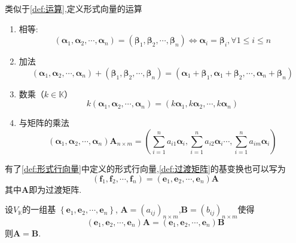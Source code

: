 \begin{formal}
\begin{definition}[形式向量的运算定义]\label{prop:形式向量的运算定义}
    类似于\cref{def:运算},定义形式向量的运算
    \begin{enumerate}[label=\textup{(\arabic*)}]
        \item 相等:
    \[
    \left(\bm{\alpha}_1,\bm{\alpha}_2,\cdots
    ,\bm{\alpha}_n\right)
    =\left(\bm{\beta}_1,\bm{\beta}_2,\cdots
    ,\bm{\beta}_n\right)
    \Longleftrightarrow 
    \bm{\alpha}_i = 
    \bm{\beta}_i,\forall
    1\leqslant i\leqslant n
    \]
    \item 加法\[
    \left(\bm{\alpha}_1,\bm{\alpha}_2,\cdots
    ,\bm{\alpha}_n\right)
    +\left(\bm{\beta}_1,\bm{\beta}_2,\cdots
    ,\bm{\beta}_n\right)
    =\left(
        \bm{\alpha}_1+\bm{\beta}_1
        ,\bm{\alpha}_1+\bm{\beta}_2,
        \cdots,\bm{\alpha}_n+
        \bm{\beta}_n
    \right)
    \]
    \item 数乘（$k\in\mathbb{K}$）\[
        k\left(\bm{\alpha}_1,\bm{\alpha}_2,\cdots
    ,\bm{\alpha}_n\right)=
    \left(k\bm{\alpha}_1,k\bm{\alpha}_2,\cdots
    ,k\bm{\alpha}_n\right)
    \]
    \item 与矩阵的乘法
    \[
    \left(\bm{\alpha}_1,\bm{\alpha}_2,\cdots
    ,\bm{\alpha}_n\right)\bm{A}_{
        n \times m
    } = 
    \left(
        \sum_{i = 1}^{n}a_{i1}\bm{\alpha}_i,
        \sum_{i=1}^{n}a_{i2}\bm{\alpha}_i
        \cdots,
        \sum_{i = 1}^{n}a_{im}\bm{\alpha}_i
    \right)
    \]
    \end{enumerate}
\end{definition}
\end{formal}
\begin{green}
\begin{corollary}[过渡矩阵的形式表出]\label{cor:过渡矩阵的形式表出}
    有了\cref{def:形式行向量}中定义的形式行向量,\cref{def:过渡矩阵}的基变换也可以写为
    \[
    \left(\bm{f}_1,\bm{f}_2,\cdots,\bm{f}_n\right)
    =\left(\bm{e}_1,\bm{e}_2,\cdots,\bm{e}_n\right)\bm{A}
    \]
其中$\bm{A}$即为过渡矩阵.
\end{corollary}
\end{green}
\begin{green}
\begin{lemma}[过渡矩阵唯一性]\label{lem:过渡矩阵唯一性}
    设$V_{\mathbb{K}}$的一组基
    $\left\{
        \bm{e}_1,\bm{e}_2,\cdots
        ,\bm{e}_n
    \right\}$,
    $\bm{A}=\left(a_{ij}\right)_{
        n \times m
    }$,$\bm{B} = 
    \left(b_{ij}\right)_{
        n \times m
    }$使得
    \[
    \left(
        \bm{e}_1,\bm{e}_2,\cdots
        ,\bm{e}_n
    \right)\bm{A}=
    \left(
        \bm{e}_1,\bm{e}_2,\cdots
        ,\bm{e}_n
    \right)\bm{B}
    \]
    则$\bm{A}=\bm{B}$.
\end{lemma}
\end{green}

